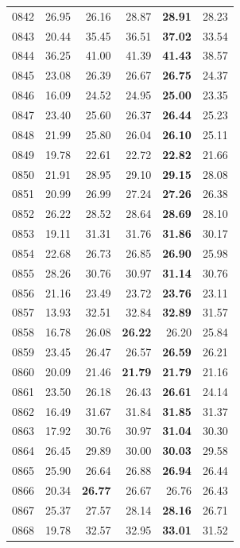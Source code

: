 \documentclass[12pt,a4paper,oneside]{NITR}
\begin{document}
{\begin{longtable}{@{}lrrrrr@{}}
0842 & 26.95 & 26.16 & 28.87 & \textbf{28.91} & 28.23 \\
0843 & 20.44 & 35.45 & 36.51 & \textbf{37.02} & 33.54 \\
0844 & 36.25 & 41.00 & 41.39 & \textbf{41.43} & 38.57 \\
0845 & 23.08 & 26.39 & 26.67 & \textbf{26.75} & 24.37 \\
0846 & 16.09 & 24.52 & 24.95 & \textbf{25.00} & 23.35 \\
0847 & 23.40 & 25.60 & 26.37 & \textbf{26.44} & 25.23 \\
0848 & 21.99 & 25.80 & 26.04 & \textbf{26.10} & 25.11 \\
0849 & 19.78 & 22.61 & 22.72 & \textbf{22.82} & 21.66 \\
0850 & 21.91 & 28.95 & 29.10 & \textbf{29.15} & 28.08 \\
0851 & 20.99 & 26.99 & 27.24 & \textbf{27.26} & 26.38 \\
0852 & 26.22 & 28.52 & 28.64 & \textbf{28.69} & 28.10 \\
0853 & 19.11 & 31.31 & 31.76 & \textbf{31.86} & 30.17 \\
0854 & 22.68 & 26.73 & 26.85 & \textbf{26.90} & 25.98 \\
0855 & 28.26 & 30.76 & 30.97 & \textbf{31.14} & 30.76 \\
0856 & 21.16 & 23.49 & 23.72 & \textbf{23.76} & 23.11 \\
0857 & 13.93 & 32.51 & 32.84 & \textbf{32.89} & 31.57 \\
0858 & 16.78 & 26.08 & \textbf{26.22} & 26.20 & 25.84 \\
0859 & 23.45 & 26.47 & 26.57 & \textbf{26.59} & 26.21 \\
0860 & 20.09 & 21.46 & \textbf{21.79} & \textbf{21.79} & 21.16 \\
0861 & 23.50 & 26.18 & 26.43 & \textbf{26.61} & 24.14 \\
0862 & 16.49 & 31.67 & 31.84 & \textbf{31.85} & 31.37 \\
0863 & 17.92 & 30.76 & 30.97 & \textbf{31.04} & 30.30 \\
0864 & 26.45 & 29.89 & 30.00 & \textbf{30.03} & 29.58 \\
0865 & 25.90 & 26.64 & 26.88 & \textbf{26.94} & 26.44 \\
0866 & 20.34 & \textbf{26.77} & 26.67 & 26.76 & 26.43 \\
0867 & 25.37 & 27.57 & 28.14 & \textbf{28.16} & 26.71 \\
0868 & 19.78 & 32.57 & 32.95 & \textbf{33.01} & 31.52 \\

\end{longtable}}
\end{document}
